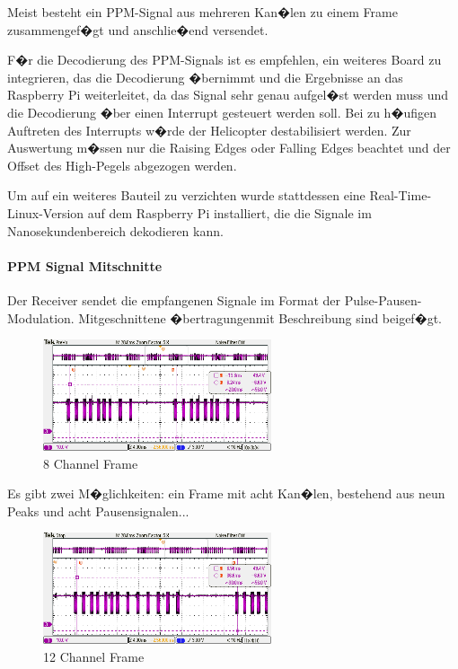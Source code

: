 Meist besteht ein PPM-Signal aus mehreren Kan�len zu einem Frame zusammengef�gt und  anschlie�end versendet.

F�r die Decodierung des PPM-Signals ist es empfehlen, ein weiteres Board zu integrieren, das die Decodierung  �bernimmt und die Ergebnisse an das Raspberry Pi weiterleitet, da das Signal sehr genau aufgel�st werden muss und die Decodierung �ber einen Interrupt gesteuert werden soll. Bei zu h�ufigen Auftreten des Interrupts w�rde der Helicopter destabilisiert werden. Zur Auswertung m�ssen nur die Raising Edges oder Falling Edges beachtet und der Offset des High-Pegels abgezogen werden.

Um auf ein weiteres Bauteil zu verzichten wurde stattdessen eine Real-Time-Linux-Version auf dem Raspberry Pi installiert, die die Signale im Nanosekundenbereich dekodieren kann.

\newpage
\paragraph{PPM Signal Mitschnitte}
Der Receiver sendet die empfangenen Signale im Format der Pulse-Pausen-Modulation. Mitgeschnittene �bertragungen\protect\footnotemark  mit Beschreibung sind beigef�gt.
\begin{figure}[H]
	\centering
	\includegraphics[width=0.6\textwidth]{fig_motor/Controller_Treiber/GraupnerGR16_8_Frame.png}
	\caption[8 Channel Frame]{8 Channel Frame}
\end{figure}

Es gibt zwei M�glichkeiten: ein Frame mit acht Kan�len, bestehend aus neun Peaks und acht Pausensignalen...

\begin{figure}[H]
	\centering
	\includegraphics[width=0.6\textwidth]{fig_motor/Controller_Treiber/GraupnerGR16_12_Frame.png}
	\caption[12 Channel Frame]{12 Channel Frame}
\end{figure}

